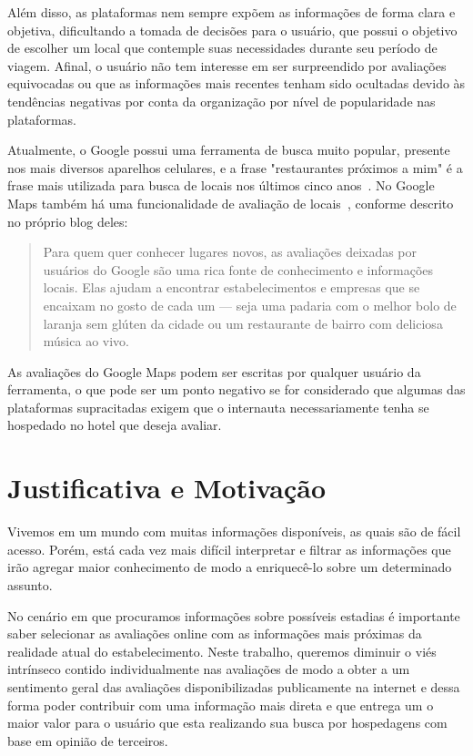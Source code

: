 Além disso, as plataformas nem sempre expõem as informações de forma clara e objetiva, dificultando a tomada de decisões para o usuário, que possui o objetivo de escolher um local que contemple suas necessidades durante seu período de viagem. Afinal, o usuário não tem interesse em ser surpreendido por avaliações equivocadas ou que as informações mais recentes tenham sido ocultadas devido às tendências negativas por conta da organização por nível de popularidade nas plataformas.

Atualmente, o Google possui uma ferramenta de busca muito popular, presente nos mais diversos aparelhos celulares, e a frase "restaurantes próximos a mim" é a frase mais utilizada para busca de locais nos últimos cinco anos~\cite{li20213}. No Google Maps também há uma funcionalidade de avaliação de locais~\cite{googleMaps2022Blog}, conforme descrito no próprio blog deles:

\begin{quote}
	Para quem quer conhecer lugares novos, as avaliações deixadas por usuários do Google são uma rica fonte de conhecimento e informações locais. Elas ajudam a encontrar estabelecimentos e empresas que se encaixam no gosto de cada um — seja uma padaria com o melhor bolo de laranja sem glúten da cidade ou um restaurante de bairro com deliciosa música ao vivo.
\end{quote}

As avaliações do Google Maps podem ser escritas por qualquer usuário da ferramenta, o que pode ser um ponto negativo se for considerado que algumas das plataformas supracitadas exigem que o internauta necessariamente tenha se hospedado no hotel que deseja avaliar.

\section{Justificativa e Motivação}

Vivemos em um mundo com muitas informações disponíveis, as quais são de fácil acesso. Porém, está cada vez mais difícil interpretar e filtrar as informações que irão agregar maior conhecimento de modo a enriquecê-lo sobre um determinado assunto.

No cenário em que procuramos informações sobre possíveis estadias é importante saber selecionar as avaliações online com as informações mais próximas da realidade atual do estabelecimento. Neste trabalho, queremos diminuir o viés intrínseco contido individualmente nas avaliações de modo a obter a um sentimento geral das avaliações disponibilizadas publicamente na internet e dessa forma poder contribuir com uma informação mais direta e que entrega um o maior valor para o usuário que esta realizando sua busca por hospedagens com base em opinião de terceiros.

